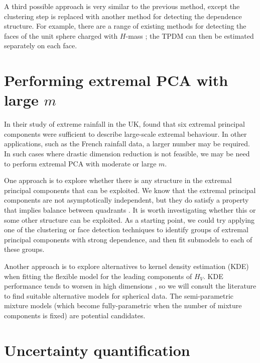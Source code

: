 \documentclass[en-GB, a4paper, nobind]{templates/bathreport}
\begin{document}
A third possible approach is very similar to the previous method, except the clustering step is replaced with another method for detecting the dependence structure. For example, there are a range of existing methods for detecting the faces of the unit sphere charged with \(H\)-mass \autocite{goixSparseRepresentationMultivariate2017,simpsonDeterminingDependenceStructure2019,meyerSparseRegularVariation2021}; the TPDM can then be estimated separately on each face.

\hypertarget{performing-extremal-pca-with-large-m}{%
\section{\texorpdfstring{Performing extremal PCA with large \(m\)}{Performing extremal PCA with large m}}\label{performing-extremal-pca-with-large-m}}

In their study of extreme rainfall in the UK, \textcite{rohrbeckSimulatingFloodEvent2021} found that six extremal principal components were sufficient to describe large-scale extremal behaviour. In other applications, such as the French rainfall data, a larger number may be required. In such cases where drastic dimension reduction is not feasible, we may be need to perform extremal PCA with moderate or large \(m\).

One approach is to explore whether there is any structure in the extremal principal components that can be exploited. We know that the extremal principal components are not asymptotically independent, but they do satisfy a property that implies balance between quadrants \autocite[Section 5]{cooleyDecompositionsDependenceHighdimensional2019}. It is worth investigating whether this or some other structure can be exploited. As a starting point, we could try applying one of the clustering or face detection techniques to identify groups of extremal principal components with strong dependence, and then fit submodels to each of these groups.

Another approach is to explore alternatives to kernel density estimation (KDE) when fitting the flexible model for the leading components of \(H_V\). KDE performance tends to worsen in high dimensions \autocite{wangNonparametricDensityEstimation2019}, so we will consult the literature to find suitable alternative models for spherical data. The semi-parametric mixture models (which become fully-parametric when the number of mixture components is fixed) are potential candidates.

\hypertarget{uncertainty-quantification}{%
\section{Uncertainty quantification}\label{uncertainty-quantification}}
\end{document}
